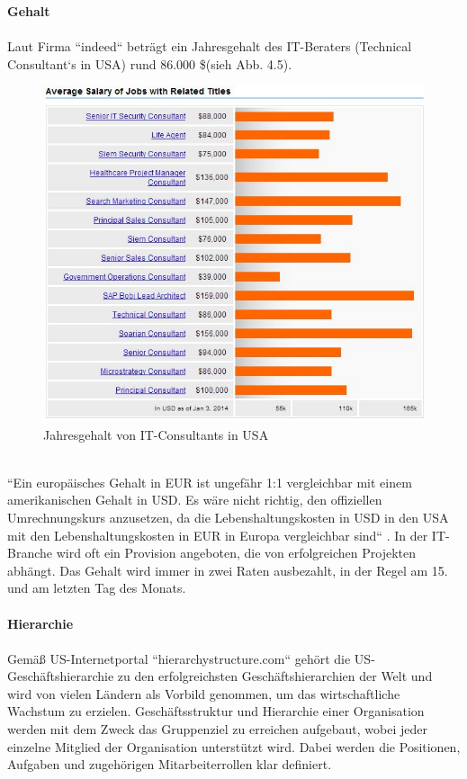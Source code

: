 	\textbf{Gehalt}\\
		\\
		Laut Firma ``indeed`` beträgt ein Jahresgehalt des IT-Beraters (Technical Consultant`s in USA) rund 86.000 \$(sieh Abb. 4.5).
		\begin{figure}[ht]
				\centering
				\includegraphics[width=0.7\linewidth]{./images/Techn_Cons_Sal}
				\caption{Jahresgehalt von IT-Consultants in USA}
				\label{fig:TechConsSal}
				\end{figure}\\
		``Ein europäisches Gehalt in EUR ist ungefähr 1:1 vergleichbar mit einem 
		amerikanischen Gehalt in USD. Es wäre nicht richtig, den offiziellen Umrechnungskurs anzusetzen, da die Lebenshaltungskosten in USD in den USA mit den Lebenshaltungskosten in EUR in Europa vergleichbar sind`` \cite{InfoUSArbVertr}. In der IT-Branche wird oft ein Provision angeboten, die von erfolgreichen 
		Projekten abhängt. Das Gehalt wird immer in zwei Raten ausbezahlt, in der Regel am 15. und am letzten Tag des Monats.\\ \\
	\textbf{Hierarchie} \\ \\
	Gemäß US-Internetportal ``hierarchystructure.com`` \cite{HierarchieUSA} gehört die US- Geschäftshierarchie zu den erfolgreichsten Geschäftshierarchien der Welt und wird von vielen Ländern als Vorbild genommen, um das wirtschaftliche Wachstum zu erzielen. Geschäftsstruktur und Hierarchie einer Organisation werden mit dem Zweck das Gruppenziel zu erreichen aufgebaut, wobei jeder einzelne Mitglied der Organisation unterstützt wird. Dabei werden die Positionen, Aufgaben und zugehörigen Mitarbeiterrollen klar definiert.
